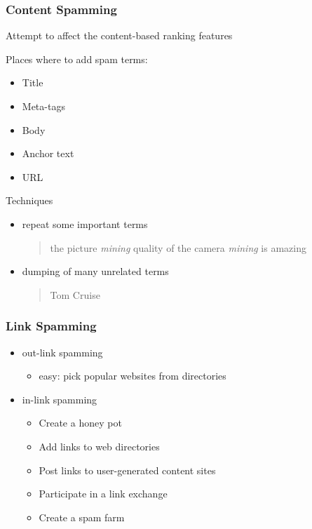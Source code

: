 \documentclass{beamer}
\begin{document}
\begin{frame}[squeeze] \frametitle{Content Spamming}

Attempt to affect the content-based ranking features

\begin{block}{Places where to add spam terms:}

\begin{itemize}

\item Title
\item Meta-tags
\item Body
\item Anchor text
\item URL

\end{itemize}

\end{block}

\begin{block}{Techniques}
\begin{itemize}
\item repeat some important terms
 \begin{quote}the picture \emph{mining} quality of the camera
   \emph{mining} is amazing\end{quote}

\item dumping of many unrelated terms 
\begin{quote}Tom Cruise\end{quote} 

\end{itemize}
\end{block}

\end{frame}


\begin{frame}  \frametitle{Link Spamming}

\begin{itemize}
    \item out-link spamming
     \begin{itemize}
        \item easy: pick popular websites from directories
    \end{itemize}

   \item in-link spamming
   \begin{itemize}
    \item Create a honey pot
    \item Add links to web directories
    \item Post links to user-generated content sites
    \item Participate in a link exchange
    \item Create a spam farm
   \end{itemize}

\end{itemize}

\end{frame}
\end{document}
